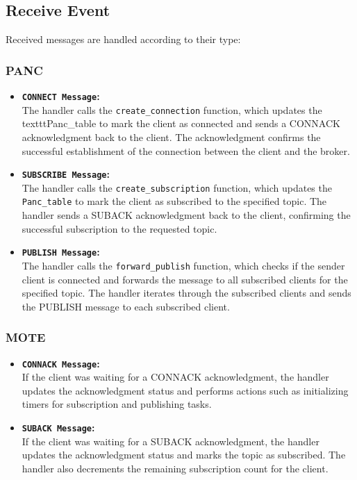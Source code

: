 \documentclass[11pt]{article}
\begin{document}
\subsection*{Receive Event}
Received messages are handled according to their type:
\subsubsection*{PANC}
\begin{itemize}
\item{\textbf{\texttt{CONNECT Message}:}}\\
The handler calls the \texttt{create\_connection} function, which updates the texttt{Panc\_table} to mark the client as connected and sends a CONNACK acknowledgment back to the client.
The acknowledgment confirms the successful establishment of the connection between the client and the broker.
\item{\textbf{\texttt{SUBSCRIBE Message}:}}\\
The handler calls the \texttt{create\_subscription} function, which updates the \texttt{Panc\_table} to mark the client as subscribed to the specified topic.
The handler sends a SUBACK acknowledgment back to the client, confirming the successful subscription to the requested topic.
\item{\textbf{\texttt{PUBLISH Message}:}}\\
The handler calls the \texttt{forward\_publish} function, which checks if the sender client is connected and forwards the message to all subscribed clients for the specified topic.
The handler iterates through the subscribed clients and sends the PUBLISH message to each subscribed client.
\end{itemize}
\subsubsection*{MOTE}
\begin{itemize}
\item{\textbf{\texttt{CONNACK Message}:}}\\
If the client was waiting for a CONNACK acknowledgment, the handler updates the acknowledgment status and performs actions such as initializing timers for subscription and publishing tasks.
\item{\textbf{\texttt{SUBACK Message}:}}\\
If the client was waiting for a SUBACK acknowledgment, the handler updates the acknowledgment status and marks the topic as subscribed.
The handler also decrements the remaining subscription count for the client.
\end{itemize}
\end{document}
